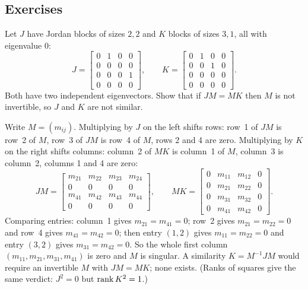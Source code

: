 \subsection{Exercises}

\begin{exercise}\label{exr:u32-JK}
Let $J$ have Jordan blocks of sizes $2,2$ and $K$ blocks of sizes $3,1$, all with eigenvalue $0$:
\[
  J=\begin{bmatrix}0&1&0&0\\0&0&0&0\\0&0&0&1\\0&0&0&0\end{bmatrix},\qquad
  K=\begin{bmatrix}0&1&0&0\\0&0&1&0\\0&0&0&0\\0&0&0&0\end{bmatrix}.
\]
Both have two independent eigenvectors. Show that if $JM=MK$ then $M$ is not invertible, so $J$
and $K$ are not similar.
\end{exercise}
\begin{solution}
Write $M=(m_{ij})$. Multiplying by $J$ on the left shifts rows: row~1 of $JM$ is row~2 of $M$,
row~3 of $JM$ is row~4 of $M$, rows 2 and 4 are zero. Multiplying by $K$ on the right shifts
columns: column~2 of $MK$ is column~1 of $M$, column~3 is column~2, columns 1 and 4 are zero:
\[
  JM=\begin{bmatrix}m_{21}&m_{22}&m_{23}&m_{24}\\0&0&0&0\\m_{41}&m_{42}&m_{43}&m_{44}\\0&0&0&0\end{bmatrix},
  \qquad
  MK=\begin{bmatrix}0&m_{11}&m_{12}&0\\0&m_{21}&m_{22}&0\\0&m_{31}&m_{32}&0\\0&m_{41}&m_{42}&0\end{bmatrix}.
\]
Comparing entries: column~1 gives $m_{21}=m_{41}=0$; row~2 gives $m_{21}=m_{22}=0$ and row~4 gives
$m_{41}=m_{42}=0$; then entry $(1,2)$ gives $m_{11}=m_{22}=0$ and entry $(3,2)$ gives
$m_{31}=m_{42}=0$. So the whole first column $(m_{11},m_{21},m_{31},m_{41})$ is zero and $M$ is
singular. A similarity $K=M^{-1}JM$ would require an invertible $M$ with $JM=MK$; none exists.
(Ranks of squares give the same verdict: $J^2=0$ but $\operatorname{rank} K^2=1$.)
\end{solution}

